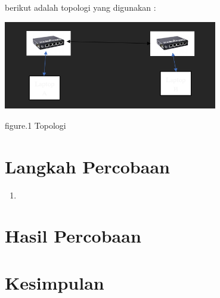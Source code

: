 berikut adalah topologi yang digunakan :

\begin{center}
    \includegraphics[width=0.7\textwidth]{image/P2/Topologi.png}    
    
    figure.1 Topologi
\end{center}


\section{Langkah Percobaan}
\begin{enumerate}
    \item 
\end{enumerate}

\section{Hasil Percobaan}


\section{Kesimpulan}


